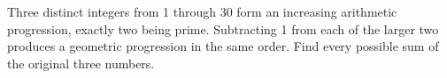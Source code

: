 Three distinct integers from 1 through 30 form an increasing arithmetic progression, exactly two being prime. Subtracting 1 from each of the larger two produces a geometric progression in the same order. Find every possible sum of the original three numbers.
